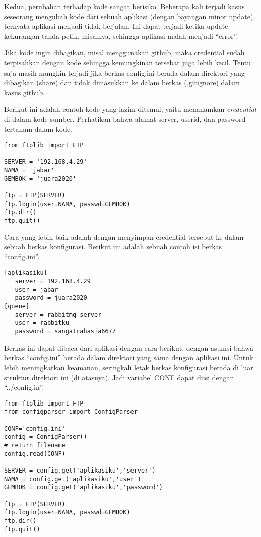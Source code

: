Kedua, perubahan terhadap kode sangat berisiko. Beberapa kali terjadi
kasus seseorang mengubah kode dari sebuah aplikasi (dengan bayangan
minor update), ternyata aplikasi menjadi tidak berjalan.
Ini dapat terjadi ketika update kekurangan tanda petik, misalnya,
sehingga aplikasi malah menjadi ``error''.

Jika kode ingin dibagikan, misal menggunakan github, maka credential
sudah terpisahkan dengan kode sehingga kemungkinan tersebar juga lebih kecil.
Tentu saja masih mungkin terjadi jika berkas config.ini berada dalam
direktori yang dibagikan (share) dan tidak dimasukkan ke dalam
berkas (.gitignore) dalam kasus github.

Berikut ini adalah contoh kode yang lazim ditemui, yaitu menanamkan
{\em credential} di dalam kode sumber. Perhatikan bahwa alamat server,
userid, dan password tertanam dalam kode.

\begin{verbatim}
from ftplib import FTP

SERVER = '192.168.4.29'
NAMA = 'jabar'
GEMBOK = 'juara2020'

ftp = FTP(SERVER)
ftp.login(user=NAMA, passwd=GEMBOK)
ftp.dir()
ftp.quit()
\end{verbatim}

Cara yang lebih baik adalah dengan menyimpan credential tersebut
ke dalam sebuah berkas konfigurasi. Berikut ini adalah sebuah
contoh isi berkas ``config.ini''.

\begin{verbatim}
[aplikasiku]
   server = 192.168.4.29
   user = jabar
   password = juara2020
[queue]
   server = rabbitmq-server
   user = rabbitku
   password = sangatrahasia6677
\end{verbatim}

Berkas ini dapat dibaca dari aplikasi dengan cara berikut, dengan asumsi
bahwa berkas ``config.ini'' berada dalam direktori yang sama dengan
aplikasi ini. Untuk lebih meningkatkan keamanan, seringkali letak berkas
konfigurasi berada di luar struktur direktori ini (di atasnya). Jadi
variabel CONF dapat diisi dengan ``../config.in''.


\begin{verbatim}
from ftplib import FTP
from configparser import ConfigParser

CONF='config.ini'
config = ConfigParser()
# return filename
config.read(CONF)

SERVER = config.get('aplikasiku','server')
NAMA = config.get('aplikasiku','user')
GEMBOK = config.get('aplikasiku','password')

ftp = FTP(SERVER)
ftp.login(user=NAMA, passwd=GEMBOK)
ftp.dir()
ftp.quit()
\end{verbatim}

